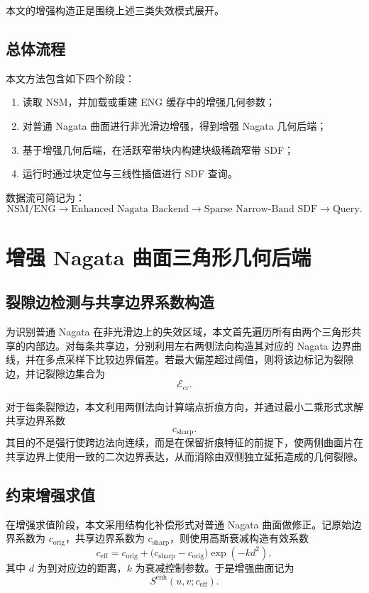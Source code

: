 \documentclass[11pt,a4paper]{ctexart}
\begin{document}
本文的增强构造正是围绕上述三类失效模式展开。

\subsection{总体流程}
本文方法包含如下四个阶段：
\begin{enumerate}[leftmargin=2em]
    \item 读取 NSM，并加载或重建 ENG 缓存中的增强几何参数；
    \item 对普通 Nagata 曲面进行非光滑边增强，得到增强 Nagata 几何后端；
    \item 基于增强几何后端，在活跃窄带块内构建块级稀疏窄带 SDF；
    \item 运行时通过块定位与三线性插值进行 SDF 查询。
\end{enumerate}
数据流可简记为：
\[
\text{NSM/ENG}\rightarrow \text{Enhanced Nagata Backend}\rightarrow \text{Sparse Narrow-Band SDF}\rightarrow \text{Query}.
\]

\section{增强 Nagata 曲面三角形几何后端}

\subsection{裂隙边检测与共享边界系数构造}
为识别普通 Nagata 在非光滑边上的失效区域，本文首先遍历所有由两个三角形共享的内部边。对每条共享边，分别利用左右两侧法向构造其对应的 Nagata 边界曲线，并在多点采样下比较边界偏差。若最大偏差超过阈值，则将该边标记为裂隙边，并记裂隙边集合为
\[
\mathcal{E}_{\mathrm{cr}}.
\]

对于每条裂隙边，本文利用两侧法向计算端点折痕方向，并通过最小二乘形式求解共享边界系数
\[
c_{\mathrm{sharp}}.
\]
其目的不是强行使跨边法向连续，而是在保留折痕特征的前提下，使两侧曲面片在共享边界上使用一致的二次边界表达，从而消除由双侧独立延拓造成的几何裂隙。

\subsection{约束增强求值}
在增强求值阶段，本文采用结构化补偿形式对普通 Nagata 曲面做修正。记原始边界系数为 $c_{\mathrm{orig}}$，共享边界系数为 $c_{\mathrm{sharp}}$，则使用高斯衰减构造有效系数
\begin{equation}
c_{\mathrm{eff}}=c_{\mathrm{orig}}+\big(c_{\mathrm{sharp}}-c_{\mathrm{orig}}\big)\exp(-k d^2),
\label{eq:ceff_final}
\end{equation}
其中 $d$ 为到对应边的距离，$k$ 为衰减控制参数。于是增强曲面记为
\[
S^{\mathrm{enh}}(u,v; c_{\mathrm{eff}}).
\]
\end{document}
